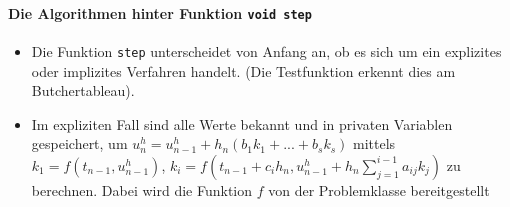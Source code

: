\documentclass[a4paper,11pt]{article}
\theoremstyle{definition}
\begin{document}
\paragraph{Die Algorithmen hinter Funktion \lstinline{void step}}
\begin{itemize}
\item Die Funktion \lstinline{step} unterscheidet von Anfang an, ob es sich um ein explizites oder implizites Verfahren handelt. (Die Testfunktion erkennt dies am Butchertableau). 
\item Im expliziten Fall sind alle Werte bekannt und in privaten Variablen gespeichert, um $u_{n}^h = u_{n-1}^h +h_n(b_1k_1+...+b_sk_s)$ mittels $k_1 = f(t_{n-1},u_{n-1}^h)$, $k_i = f(t_{n-1}+c_ih_n, u_{n-1}^h+h_n \sum_{j=1}^{i-1}a_{ij}k_j)$ zu berechnen. Dabei wird die Funktion $f$ von der Problemklasse bereitgestellt


\end{itemize}
\end{document}
